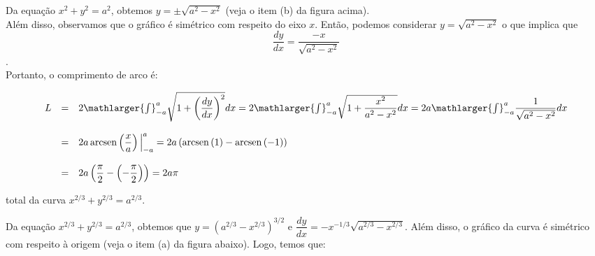 \cleardoublepage\documentclass[../main.tex]{subfiles}
\begin{document}
\begin{ex}
\begin{compactenum}[a)]
\begin{solution}

Da equação \(x^2+y^2 =a^2\), obtemos \(y=\pm \sqrt{a^2-x^2}\) (veja o item (b) da figura acima).\\ Além disso, observamos que o gráfico é simétrico com respeito do eixo \(x\). Então, podemos considerar \(y=\sqrt{a^2-x^2}\) o que implica que \[\dfrac{dy}{dx}=\dfrac{-x}{\sqrt{a^2-x^2}}\].\\ Portanto, o comprimento de arco é:

\[ \begin{array}{rcl} L&=& 2\mathlarger{\int}^{a}_{-a} \sqrt{ 1+ \left(\dfrac{dy}{dx}\right)^2} dx = 2\mathlarger{\int}^{a}_{-a} \sqrt{ 1+ \dfrac{x^2}{a^2-x^2}} dx= 2a \mathlarger{\int}^{a}_{-a} \dfrac{1}{\sqrt{a^2-x^2}} dx \\ \\ &=& 2a\, {\rm arcsen}\left(\dfrac{x}{a}\right) \Big{|}^{a}_{-a} = 2a\left( {\rm arcsen\,}(1) - {\rm arcsen\,}( -1) \right) \\ \\ &=&2a \left( \dfrac{\pi}{2} - \left(-\dfrac{\pi}{2} \right)\right) = 2a \pi \end{array} \]
\end{solution}
\item total da curva \( x^{2/3} + y^{2/3} = a^{2/3}\).

\begin{solution}
Da equação \(x^{2/3} + y^{2/3} = a^{2/3}\), obtemos que \(y = \left( a^{2/3} -x^{2/3} \right)^{3/2}\) e \(\dfrac{dy}{dx}=-x^{-1/3} \sqrt{a^{2/3} -x^{2/3} }\). Além disso, o gráfico da curva é simétrico com respeito à origem (veja o item (a) da figura abaixo). Logo, temos que:


\end{solution}
\end{compactenum}
\end{ex}
\end{document}
